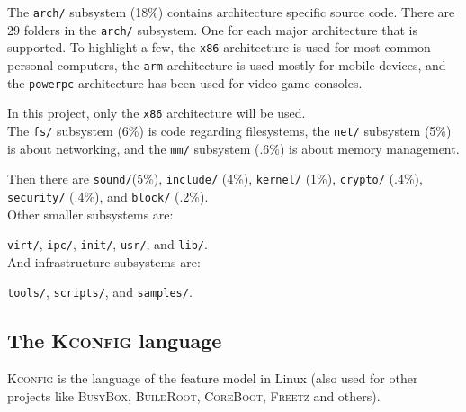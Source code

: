 \documentclass[a4paper,11pt]{report}
\newcommand{\figa}{
    \begin{figure}[!htpb]
    \centering
}
\newcommand{\figb}[2]{
    \caption{#1}
    \label{#2}
    \end{figure}
}
\begin{document}
The \texttt{arch/} subsystem (18\%) contains architecture specific source code. 
There are 29 folders in the \texttt{arch/} subsystem. One for each major 
architecture that is supported. To highlight a few, the \texttt{x86} 
architecture is used for most common personal computers, the \texttt{arm} 
architecture is used mostly for mobile devices, and the \texttt{powerpc} 
architecture has been used for video game consoles.

In this project, only the \texttt{x86} architecture will be used.
\\

The \texttt{fs/} subsystem (6\%) is code regarding filesystems, the 
\texttt{net/} subsystem (5\%) is about networking, and the \texttt{mm/} 
subsystem (.6\%) is about memory management.

Then there are \texttt{sound/}(5\%), \texttt{include/} (4\%), \texttt{kernel/} 
(1\%), \texttt{crypto/} (.4\%), \texttt{security/}  (.4\%), and \texttt{block/} 
(.2\%).
\\

Other smaller subsystems are:

\texttt{virt/}, \texttt{ipc/}, \texttt{init/}, \texttt{usr/}, and \texttt{lib/}.
\\

And infrastructure subsystems are:

\texttt{tools/}, \texttt{scripts/}, and \texttt{samples/}.

            \subsection{The \textsc{Kconfig} language} 
\textsc{Kconfig} is the language of the feature model in Linux (also used for 
other projects like \textsc{BusyBox}, \textsc{BuildRoot}, \textsc{CoreBoot}, 
\textsc{Freetz} and others)\cite[p. 4]{VarModSSD}.
\end{document}
